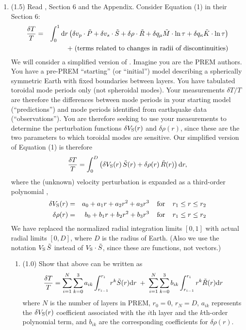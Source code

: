 \documentclass[11pt,titlepage,fleqn]{article}
\begin{document}
\begin{enumerate}
\item (1.5) Read \citet{PREM}, Section 6 and the Appendix. Consider Equation (1) in their Section 6:
%
\begin{eqnarray}
\frac{\delta T}{T} &=& \int_0^1 \mathrm{d} r \left(
\delta v_p \cdot \tilde{P} + 
\delta v_s \cdot \tilde{S} +
\delta\rho \cdot \tilde{R} +
\delta q_\mu \tilde{M} \cdot \ln\tau +
\delta q_\kappa \tilde{K} \cdot \ln\tau
\right)
\nonumber \\
&& + \; \text{(terms related to changes in radii of discontinuities)}
\label{dTprem}
\end{eqnarray}
%
We will consider a simplified version of .
Imagine you are the PREM authors. You have a pre-PREM ``starting'' (or ``initial'') model describing a spherically symmetric Earth with fixed boundaries between layers. You have tabulated toroidal mode periods only (not spheroidal modes). Your measurements $\delta T/T$ are therefore the differences between mode periods in your starting model (``predictions'') and mode periods identified from earthquake data (``observations''). You are therefore seeking to use your measurements to determine the perturbation functions $\delta V_{\rm S}(r)$ and $\delta\rho(r)$, since these are the two parameters to which toroidal modes are sensitive. Our simplified version of Equation (1) is therefore
%
\begin{equation}
\frac{\delta T}{T} = \int_0^D \left(\delta V_{\rm S}(r) \, \tilde{S}(r) + \delta\rho(r) \, \tilde{R}(r)\right) \mathrm{d} r,
\label{dT1}
\end{equation}
%
where the (unknown) velocity perturbation is expanded as a third-order polynomial \citep[][p.~307]{PREM},
%
\begin{eqnarray*}
\delta V_{\rm S}(r) &=& a_0 + a_1 r + a_2 r^2 + a_3 r^3
\;\;\;\;{\rm for}\;\;\;\; r_1 \le r \le r_2
\\
\delta\rho(r) &=& b_0 + b_1 r + b_2 r^2 + b_3 r^3
\;\;\;\;{\rm for}\;\;\;\; r_1 \le r \le r_2
\label{dvs}
\end{eqnarray*}
%
We have replaced the normalized radial integration limits $[0,1]$ with actual radial limits $[0,D]$, where $D$ is the radius of Earth. (Also we use the notation $V_{\rm S}\,\tilde{S}$ instead of $V_{\rm S} \cdot \tilde{S}$, since these are functions, not vectors.)

\begin{enumerate}
\item (1.0) Show that  above can be written as
%
\begin{equation}
\frac{\delta T}{T} = \sum_{i=1}^N \sum_{k=0}^3 a_{ik} \int_{r_{i-1}}^{r_i} r^{k} \tilde{S}(r) \mathrm{d} r
\;+\; \sum_{i=1}^N \sum_{k=0}^3 b_{ik} \int_{r_{i-1}}^{r_i} r^{k} \tilde{R}(r) \mathrm{d} r
\label{dT2}
\end{equation}
%
where $N$ is the number of layers in PREM, $r_0 = 0$, $r_N = D$, $a_{ik}$ represents the $\delta V_{\rm S}(r)$ coefficient associated with the $i$th layer and the $k$th-order polynomial term, and $b_{ik}$ are the corresponding coefficients for $\delta\rho(r)$.


\end{enumerate}
\end{enumerate}
\end{document}
